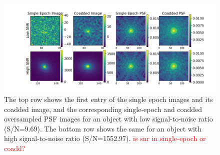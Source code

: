 \documentclass[fleqn,usenatbib]{mnras}
\begin{document}
\begin{figure}
	\includegraphics[width=\textwidth]{figure2.pdf}
	\vspace*{-10mm}
    \caption{The top row shows the first entry of the single epoch images and its coadded image, and the corresponding single-epoch and coadded oversampled PSF images for an object with low signal-to-noise ratio (S/N=9.69). The bottom row shows the same for an object with high signal-to-noise ratio (S/N=1552.97). \textcolor{red}{is snr in single-epoch or coadd?}}
    \label{fig:singlecoadd}
\end{figure}
\end{document}
